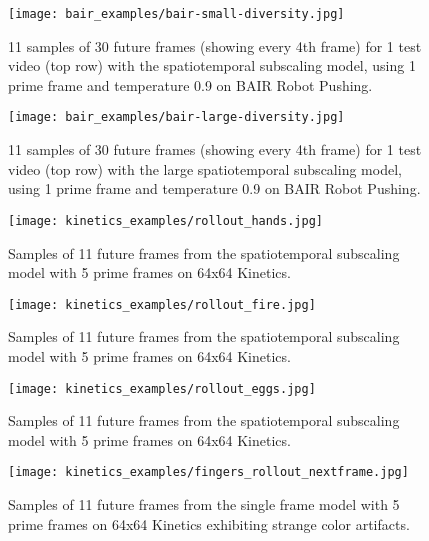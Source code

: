 \documentclass{article} \usepackage{iclr2020_conference,times}
\begin{document}
\begin{figure}[p]
    \centering
    \texttt{[image: bair\_examples/bair-small-diversity.jpg]}
    \caption{11 samples of 30 future frames (showing every 4th frame) for 1 test video (top row) with the spatiotemporal subscaling model, using 1 prime frame and temperature 0.9 on BAIR Robot Pushing.}
    \label{fig:bair-diversity-small}
\end{figure}

\begin{figure}[p]
    \centering
    \texttt{[image: bair\_examples/bair-large-diversity.jpg]}
    \caption{11 samples of 30 future frames (showing every 4th frame) for 1 test video (top row) with the large spatiotemporal subscaling model, using 1 prime frame and temperature 0.9 on BAIR Robot Pushing.}
    \label{fig:bair-diversity-large}
\end{figure}

\begin{figure}[p]
    \centering
    \texttt{[image: kinetics\_examples/rollout\_hands.jpg]}
    \caption{Samples of 11 future frames from the spatiotemporal subscaling model with 5 prime frames on 64x64 Kinetics.}
    \label{fig:rollout_hands}
\end{figure}

\begin{figure}[p]
    \centering
    \texttt{[image: kinetics\_examples/rollout\_fire.jpg]}
    \caption{Samples of 11 future frames from the spatiotemporal subscaling model with 5 prime frames on 64x64 Kinetics.}
    \label{fig:rollout_fire}
\end{figure}


\begin{figure}[p]
    \centering
    \texttt{[image: kinetics\_examples/rollout\_eggs.jpg]}
    \caption{Samples of 11 future frames from the spatiotemporal subscaling model with 5 prime frames on 64x64 Kinetics.}
    \label{fig:rollout_eggs}
\end{figure}

\begin{figure}[p]
    \centering
    \texttt{[image: kinetics\_examples/fingers\_rollout\_nextframe.jpg]}
    \caption{Samples of 11 future frames from the single frame model with 5 prime frames on 64x64 Kinetics exhibiting strange color artifacts.}
    \label{fig:rollout_fingers_nextframe}
\end{figure}
\end{document}
